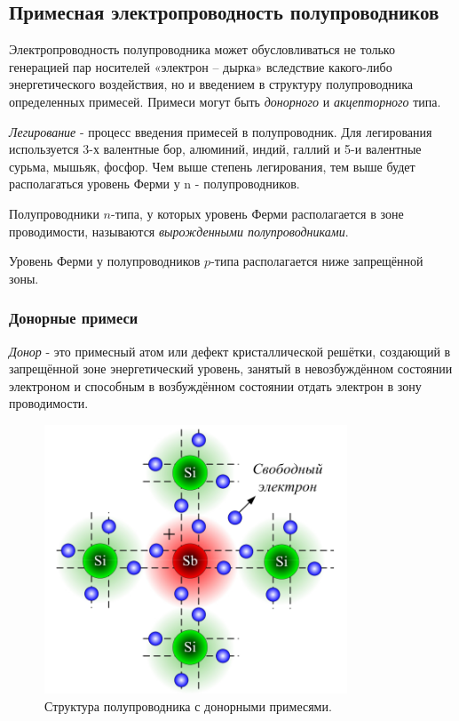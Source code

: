     \subsection{Примесная электропроводность полупроводников}
    
    \par Электропроводность полупроводника может обусловливаться не только генерацией пар носителей «электрон – дырка» вследствие какого-либо энергетического воздействия, но и введением в структуру полупроводника определенных примесей. Примеси могут быть \textit{донорного} и \textit{акцепторного} типа.
    
    \par \textit{Легирование} - процесс введения примесей в полупроводник. Для легирования используется 3-х валентные бор, алюминий, индий, галлий и 5-и валентные сурьма, мышьяк, фосфор. Чем выше степень легирования, тем выше будет располагаться уровень Ферми у n - полупроводников.
    \par Полупроводники \(n\)-типа, у которых уровень Ферми располагается в зоне проводимости, называются \textit{вырожденными полупроводниками}.
    
    \par Уровень Ферми у полупроводников \(p\)-типа располагается ниже запрещённой зоны.
   
    \subsubsection{Донорные примеси}
    
    \par \textit{Донор} - это примесный атом или дефект кристаллической решётки, создающий в запрещённой зоне энергетический уровень, занятый в невозбуждённом состоянии электроном и способным в возбуждённом состоянии отдать электрон в зону проводимости.
    
    \begin{figure}[h]
    	\centering
    	\includegraphics[height=8cm]{img/8} 
    	\captionsetup{font=footnotesize}
    	\caption{Структура полупроводника с донорными примесями.} 
    \end{figure}
    
